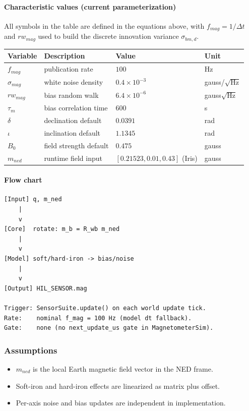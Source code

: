 \documentclass[11pt,a4paper]{article}
\begin{document}
\paragraph{Characteristic values (current parameterization)}
All symbols in the table are defined in the equations above, with $f_{mag}=1/\Delta t$ and $rw_{mag}$ used to build the discrete innovation variance $\sigma_{bm,d}$.
\begin{center}
\begin{tabular}{llll}
\toprule
Variable & Description & Value & Unit \\
\midrule
$f_{mag}$ & publication rate & $100$ & Hz \\
$\sigma_{mag}$ & white noise density & $0.4\times10^{-3}$ & gauss/\(\sqrt{\text{Hz}}\) \\
$rw_{mag}$ & bias random walk & $6.4\times10^{-6}$ & gauss\(\sqrt{\text{Hz}}\) \\
$\tau_m$ & bias correlation time & $600$ & s \\
$\delta$ & declination default & $0.0391$ & rad \\
$\iota$ & inclination default & $1.1345$ & rad \\
$B_0$ & field strength default & $0.475$ & gauss \\
$m_{ned}$ & runtime field input & $[0.21523,0.01,0.43]$ (Iris) & gauss \\
\bottomrule
\end{tabular}
\end{center}

\paragraph{Flow chart}
{\footnotesize
\begin{verbatim}
[Input] q, m_ned
    |
    v
[Core]  rotate: m_b = R_wb m_ned
    |
    v
[Model] soft/hard-iron -> bias/noise
    |
    v
[Output] HIL_SENSOR.mag

Trigger: SensorSuite.update() on each world update tick.
Rate:    nominal f_mag = 100 Hz (model dt fallback).
Gate:    none (no next_update_us gate in MagnetometerSim).
\end{verbatim}
}

\subsubsection*{Assumptions}
\begin{itemize}
    \item $m_{ned}$ is the local Earth magnetic field vector in the NED frame.
    \item Soft-iron and hard-iron effects are linearized as matrix plus offset.
    \item Per-axis noise and bias updates are independent in implementation.
\end{itemize}
\end{document}
